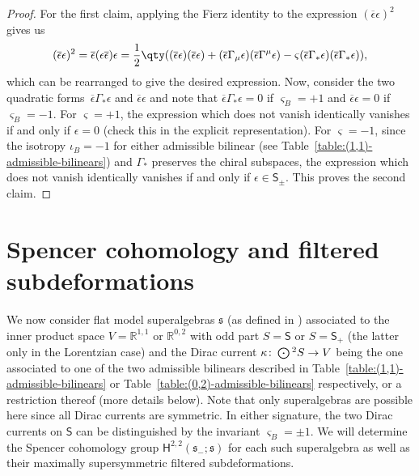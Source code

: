 \documentclass[pdftex]{sigma}
\numberwithin{equation}{section}
\newcommand{\fs}{\mathfrak{s}}
\newcommand{\RR}{\mathbb{R}}
\newcommand{\ssH}{\mathsf{H}}
\newcommand{\ssS}{\mathsf{S}}
\newcommand{\Odot}{\mathchoice{{\textstyle\bigodot}}{\bigodot}{\bigodot}{\bigodot}}
\newcommand{\1}{\mathbbm{1}}
\begin{document}
\begin{proof}
	For the first claim, applying the Fierz identity to the expression $(\overline\epsilon\epsilon)^2$ gives us
\[
		(\overline\epsilon\epsilon)^2 = \overline\epsilon(\epsilon\overline\epsilon)\epsilon
			= \frac{1}{2}\qty((\overline\epsilon\epsilon)(\overline\epsilon\epsilon) + (\overline\epsilon\Gamma_\mu\epsilon)(\overline\epsilon\Gamma^\mu\epsilon) - \varsigma(\overline\epsilon\Gamma_*\epsilon)(\overline\epsilon\Gamma_*\epsilon)),
\]
	which can be rearranged to give the desired expression. Now, consider the two quadratic forms~$\overline\epsilon\Gamma_*\epsilon$ and $\overline\epsilon\epsilon$ and note that $\overline\epsilon\Gamma_*\epsilon=0$ if $\varsigma_B=+1$ and $\overline\epsilon\epsilon=0$ if $\varsigma_B=-1$. For $\varsigma=+1$, the expression which does not vanish identically vanishes if and only if $\epsilon=0$ (check this in the explicit representation). For $\varsigma=-1$, since the isotropy $\iota_B=-1$ for either admissible bilinear (see Table~\ref{table:(1,1)-admissible-bilinears}) and $\Gamma_*$ preserves the chiral subspaces, the expression which does not vanish identically vanishes if and only if $\epsilon\in \ssS_\pm$. This proves the second claim.
\end{proof}

\section{Spencer cohomology and filtered subdeformations}
\label{sec:2d-spencer}

We now consider flat model superalgebras $\fs$ (as defined in \cite[Definition~2.1]{Beckett2024_2}) associated to the inner product space $V=\RR^{1,1}$ or $\RR^{0,2}$ with odd part $S=\ssS$ or $S=\ssS_+$ (the latter only in the Lorentzian case) and the Dirac current $\kappa\colon\Odot^2S\to V$ being the one associated to one of the two admissible bilinears described in Table~\ref{table:(1,1)-admissible-bilinears} or Table~\ref{table:(0,2)-admissible-bilinears} respectively, or a restriction thereof (more details below). Note that only superalgebras are possible here since all Dirac currents are symmetric. In either signature, the two Dirac currents on $\ssS$ can be distinguished by the invariant $\varsigma_B=\pm 1$. We will determine the Spencer cohomology group $\ssH^{2,2}(\fs_-;\fs)$ for each such superalgebra as well as their maximally supersymmetric filtered subdeformations.
\end{document}
